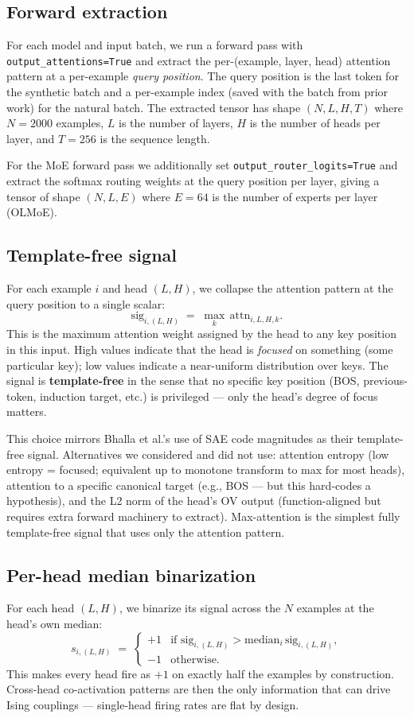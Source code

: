 \documentclass[11pt]{article}
\begin{document}
\subsection{Forward extraction}
For each model and input batch, we run a forward pass with
\texttt{output\_attentions=True} and extract the per-(example, layer, head)
attention pattern at a per-example \emph{query position}. The query
position is the last token for the synthetic batch and a per-example index
(saved with the batch from prior work) for the natural batch. The extracted
tensor has shape $(N, L, H, T)$ where $N=2000$ examples, $L$ is the number
of layers, $H$ is the number of heads per layer, and $T=256$ is the
sequence length.

For the MoE forward pass we additionally set
\texttt{output\_router\_logits=True} and extract the softmax routing
weights at the query position per layer, giving a tensor of shape
$(N, L, E)$ where $E=64$ is the number of experts per layer (OLMoE).

\subsection{Template-free signal}
For each example $i$ and head $(L, H)$, we collapse the attention pattern
at the query position to a single scalar:
\[
\text{sig}_{i, (L, H)} \;=\; \max_k\, \text{attn}_{i, L, H, k}.
\]
This is the maximum attention weight assigned by the head to any key
position in this input. High values indicate that the head is \emph{focused}
on something (some particular key); low values indicate a near-uniform
distribution over keys. The signal is \textbf{template-free} in the sense
that no specific key position (BOS, previous-token, induction target, etc.)
is privileged --- only the head's degree of focus matters.

This choice mirrors Bhalla et al.'s use of SAE code magnitudes as their
template-free signal. Alternatives we considered and did not use: attention
entropy (low entropy = focused; equivalent up to monotone transform to max
for most heads), attention to a specific canonical target (e.g., BOS ---
but this hard-codes a hypothesis), and the L2 norm of the head's OV output
(function-aligned but requires extra forward machinery to extract).
Max-attention is the simplest fully template-free signal that uses only the
attention pattern.

\subsection{Per-head median binarization}
For each head $(L, H)$, we binarize its signal across the $N$ examples at
the head's own median:
\[
s_{i, (L,H)} \;=\;
  \begin{cases}
    +1 & \text{if } \text{sig}_{i, (L, H)} > \text{median}_i\,\text{sig}_{i, (L, H)}, \\
    -1 & \text{otherwise.}
  \end{cases}
\]
This makes every head fire as $+1$ on exactly half the examples by
construction. Cross-head co-activation patterns are then the only
information that can drive Ising couplings --- single-head firing rates are
flat by design.
\end{document}
